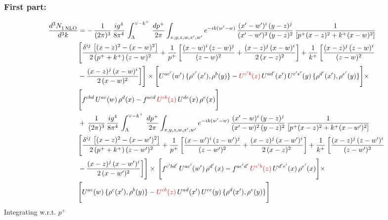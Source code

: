 \documentclass[9pt]{article}
\numberwithin{equation}{section}
\begin{document}
\subsubsection{First part:\,}
\begin{align}
    \frac{d^{3}N_{1\,\rm NLO}^{\rm}}{d^{3}k}  & = -\,\frac{1}{(2\pi)^{3}}\, \frac{ig^{4}}{8\pi^{4}}\, \int_{\Lambda}^{\vee-k^{+}}\, \frac{dp^{+}}{2\pi}\int_{x,y,z,w,x',w^{\prime}} e^{-ik(w^{\prime}-w)}\, \frac{(x'-w')^{i}\,(y-z)^{j}}{(x'-w')^{2}\,(y-z)^{2}}\,\frac{1}{\left[p^{+}(x-z)^{2}+k^{+}(x-w)^{2}\right]} \notag \\ & \Bigg[\frac{\delta^{ij}\, \left[(x-z)^{2}-(x-w)^{2}\right]}{2\, (p^{+}+k^{+})\,(z-w)^{2}}+\frac{1}{p^{+}}\, \bigg[\frac{(x-w)^{i}\,(z-w)^{j}}{(z-w)^{2}}+\frac{(x-z)^{j}\,(x-w)^{i}}{2\,(x-z)^{2}}\bigg]+\frac{1}{k^{+}}\,\bigg[\frac{(x-z)^{j}\,(z-w)^{i}}{(z-w)^{2}}\notag \\ & -\frac{(x-z)^{j}\,(x-w)^{i}}{2\,(x-w)^{2}}\bigg]\Bigg]\times \Bigg[U^{ac'}(w')\,\{\rho^{c'}(x'),\rho^{b}(y)\}-{\color{red}U^{c'b}(z)}\,U^{ad'}(x')\,U^{c'e'}(y)\, \{\rho^{d'}(x'),\rho^{e'}(y)\}\Bigg]\times \notag \\ & \Bigg[f^{cbd}\,U^{ac}(w)\,\rho^{d}(x)-f^{acd}\, {\color{red}U^{cb}(z)}\,U^{de}(x)\,\rho^{e}(x)\Bigg]\notag \\ & +\,\frac{1}{(2\pi)^{3}}\, \frac{ig^{4}}{8\pi^{4}}\, \int_{\Lambda}^{\vee-k^{+}}\,\frac{dp^{+}}{2\pi}\int_{x,y,z,w,x',w^{\prime}} e^{-ik(w^{\prime}-w)}\, \frac{(x'-w)^{i}\,(y-z)^{j}}{(x'-w)^{2}\,(y-z)^{2}}\,\frac{1}{\left[p^{+}(x-z)^{2}+k^{+}(x-w')^{2}\right]} \notag \\ & \Bigg[\frac{\delta^{ij}\, \left[(x-z)^{2}-(x-w')^{2}\right]}{2\, (p^{+}+k^{+})\,(z-w')^{2}}+\frac{1}{p^{+}}\, \bigg[\frac{(x-w')^{i}\,(z-w')^{j}}{(z-w')^{2}}+\frac{(x-z)^{j}\,(x-w')^{i}}{2\,(x-z)^{2}}\bigg]+\frac{1}{k^{+}}\,\bigg[\frac{(x-z)^{j}\,(z-w')^{i}}{(z-w')^{2}}\notag \\ & -\frac{(x-z)^{j}\,(x-w')^{i}}{2\,(x-w')^{2}}\bigg]\Bigg]\times\,\Bigg[f^{c'bd'}\,U^{ac'}(w')\,\rho^{d'}(x)-f^{ac'd'}\, {\color{red}U^{c'b}(z)}\,U^{d'e'}(x)\,\rho^{e'}(x)\Bigg] \times \notag \\ & \Bigg[U^{ac}(w)\,\{\rho^{c}(x'),\rho^{b}(y)\}-{\color{red}U^{cb}(z)}\,U^{ad}(x')\,U^{ce}(y)\, \{\rho^{d}(x'),\rho^{e}(y)\}\Bigg]
\end{align}
Integrating w.r.t. $p^{+}$ 
\end{document}

